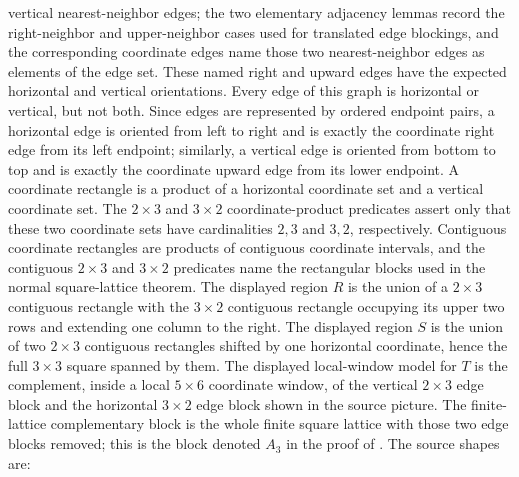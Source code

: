 \begin{definition}
    vertical nearest-neighbor edges; the two elementary adjacency lemmas record
    the right-neighbor and upper-neighbor cases used for translated edge
    blockings, and the corresponding coordinate edges name those two
    nearest-neighbor edges as elements of the edge set. These named right and
    upward edges have the expected horizontal and vertical orientations.
    Every edge of this
    graph is horizontal or vertical, but not both. Since edges are represented
    by ordered endpoint pairs, a horizontal edge is oriented from left to right
    and is exactly the coordinate right edge from its left endpoint; similarly,
    a vertical edge is oriented from bottom to top and is exactly the
    coordinate upward edge from its lower endpoint.
    A coordinate rectangle is a product of a horizontal coordinate set and a
    vertical coordinate set. The $2\times3$ and
    $3\times2$ coordinate-product predicates assert only that these two
    coordinate sets have cardinalities $2,3$ and $3,2$, respectively.
    Contiguous coordinate rectangles are products of contiguous coordinate
    intervals, and the contiguous $2\times3$ and $3\times2$ predicates name the
    rectangular blocks used in the normal square-lattice theorem. The
    displayed region $R$ is the union of a $2\times3$ contiguous rectangle
    with the $3\times2$ contiguous rectangle occupying its upper two rows and
    extending one column to the right. The displayed region $S$ is the union
    of two $2\times3$ contiguous rectangles shifted by one horizontal
    coordinate, hence the full $3\times3$ square spanned by them. The
    displayed local-window model for $T$ is the complement, inside a local
    $5\times6$ coordinate window, of the vertical $2\times3$ edge block
    and the horizontal $3\times2$ edge block shown in the source picture.
    The finite-lattice complementary block is the whole finite square lattice
    with those two edge blocks removed; this is the block denoted $A_3$ in
    the proof of \cite[Theorem~3]{Molnar2018NormalPEPS}.
    The source shapes are:
    \begin{center}
        \TNPEPSNormalRegionsRS

        \vspace{0.5em}

        \TNPEPSNormalRegionT
    \end{center}
\end{definition}

